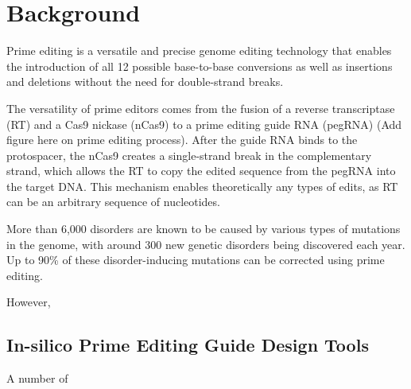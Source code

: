 \section{Background}

Prime editing is a versatile and precise genome editing technology that enables the introduction of all 12 possible base-to-base conversions as well as insertions and deletions without the need for double-strand breaks\cite{liudavidr.SearchandreplaceGenomeEditing2019}. 

The versatility of prime editors comes from the fusion of a reverse transcriptase (RT) and a Cas9 nickase (nCas9) to a prime editing guide RNA (pegRNA) (Add figure here on prime editing process). After the guide RNA binds to the protospacer, the nCas9 creates a single-strand break in the complementary strand, which allows the RT to copy the edited sequence from the pegRNA into the target DNA. This mechanism enables theoretically any types of edits, as RT can be an arbitrary sequence of nucleotides. 

More than 6,000 disorders are known to be caused by various types of mutations in the genome, with around 300 new genetic disorders being discovered each year\cite{petraityteGenomeEditingMedicine2021}. Up to 90\% of these disorder-inducing mutations can be corrected using prime editing\cite{kantorCRISPRCas9DNABaseEditing2020}.

However, 

\subsection*{In-silico Prime Editing Guide Design Tools}

A number of 